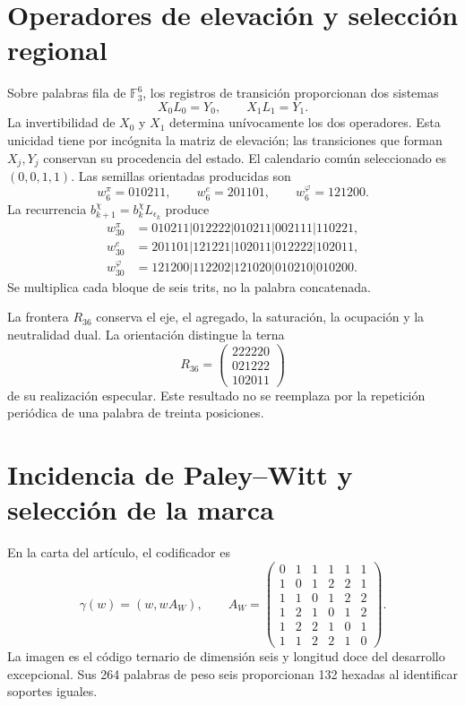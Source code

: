 \documentclass[11pt,a4paper]{article}
\newcommand{\F}{\mathbb F}
\begin{document}
\section{Operadores de elevación y selección regional}

Sobre palabras fila de $\F_3^6$, los registros de transición proporcionan
dos sistemas
\[
 X_0L_0=Y_0,\qquad X_1L_1=Y_1.
\]
La invertibilidad de $X_0$ y $X_1$ determina unívocamente los dos operadores.
Esta unicidad tiene por incógnita la matriz de elevación; las transiciones
que forman $X_j,Y_j$ conservan su procedencia del estado. El calendario común
seleccionado es $(0,0,1,1)$. Las semillas orientadas producidas son
\[
 w_6^\pi=010211,\qquad w_6^e=201101,\qquad
 w_6^\varphi=121200.
\]
La recurrencia $b_{k+1}^\chi=b_k^\chi L_{\epsilon_k}$ produce
\begin{align*}
 w_{30}^{\pi}&=010211|012222|010211|002111|110221,\\
 w_{30}^{e}&=201101|121221|102011|012222|102011,\\
 w_{30}^{\varphi}&=121200|112202|121020|010210|010200.
\end{align*}
Se multiplica cada bloque de seis trits, no la palabra concatenada.

La frontera $R_{36}$ conserva el eje, el agregado, la saturación, la ocupación
y la neutralidad dual. La orientación distingue la terna
\[
 R_{36}=\begin{pmatrix}222220\\021222\\102011\end{pmatrix}
\]
de su realización especular. Este resultado no se reemplaza por la repetición
periódica de una palabra de treinta posiciones.

\section{Incidencia de Paley--Witt y selección de la marca}

En la carta del artículo, el codificador es
\[
 \gamma(w)=(w,wA_W),\qquad
 A_W=\begin{pmatrix}
 0&1&1&1&1&1\\1&0&1&2&2&1\\1&1&0&1&2&2\\
 1&2&1&0&1&2\\1&2&2&1&0&1\\1&1&2&2&1&0
 \end{pmatrix}.
\]
La imagen es el código ternario de dimensión seis y longitud doce del
desarrollo excepcional. Sus 264 palabras de peso seis proporcionan 132
hexadas al identificar soportes iguales.
\end{document}
